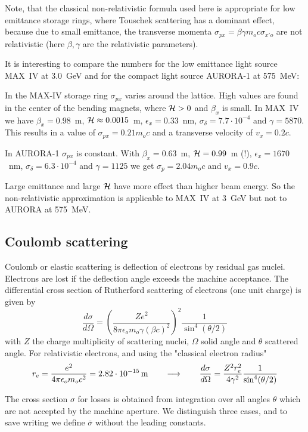 \documentclass[12pt]{article}
\newcommand\beq{\begin{equation}}
\newcommand\eeq{\end{equation}}
\begin{document}
Note, that the classical non-relativistic formula used here is appropriate for low emittance storage rings, where Touschek scattering has a dominant effect, because due to small emittance, the transverse momenta $\sigma_{px}=\beta\gamma m_oc \sigma_{x'o}$ are not relativistic (here $\beta,\gamma$ are the relativistic parameters).

It is interesting to compare the numbers for the low emittance light source MAX~IV at 3.0~GeV and for the compact light source AURORA-1 at 575~MeV:

In the MAX-IV storage ring $\sigma_{px}$ varies around the lattice. High values are found in the center of the bending magnets, where ${\cal H}>0$ and $\beta_x$ is small.
In MAX~IV we have $\beta_x=0.98$~m, ${\cal H}\approx 0.0015$~m, $\epsilon_x= 0.33$~nm, $\sigma_{\delta}=7.7\cdot 10^{-4}$ and $\gamma = 5870$. This results in a value of $\sigma_{px}=0.21 m_oc$ and a transverse velocity of $v_x=0.2c$.

In AURORA-1 $\sigma_{px}$ is constant. With $\beta_x=0.63$~m, ${\cal H} = 0.99$~m (!), $\epsilon_x= 1670$~nm, $\sigma_{\delta}=6.3\cdot 10^{-4}$ and $\gamma = 1125$ we get $\sigma_p=2.04 m_oc$ and $v_x=0.9c$.

Large emittance and large ${\cal H}$ have more effect than higher beam energy. So the non-relativistic approximation is applicable to MAX~IV at 3~GeV but not to AURORA at 575~MeV.

\subsection{Coulomb scattering}

Coulomb or elastic scattering is deflection of electrons by residual gas nuclei. Electrons are lost if the deflection angle exceeds the machine acceptance.
The differential cross section of Rutherford scattering of electrons (one unit charge) is given by
\beq
\frac{d\sigma}{d\Omega}=\left( \frac{Ze^2}{8\pi\epsilon_o m_o\gamma (\beta c)^2}\right)^2 \frac{1}{\sin^4(\theta/2)}
\eeq
with $Z$ the charge multiplicity of scattering nuclei, $\Omega$ solid angle and $\theta$ scattered angle.
For relativistic electrons, and using the "classical electron radius"
\beq\label{sdiff}
r_e=\frac{e^2}{4\pi\epsilon_om_oc^2} =2.82\cdot 10^{-15}\,\mbox{\rm m}\qquad \longrightarrow \qquad
\frac{d\sigma}{d\Omega}=\frac{Z^2 r_e^2}{4 \gamma^2} \frac{1}{\sin^4(\theta/2)}
\eeq

The cross section $\sigma$ for losses is obtained from integration over all angles $\theta$ which are not accepted by the machine aperture. We distinguish three cases, and to save writing we define $\bar\sigma$ without the leading constants.
\end{document}
